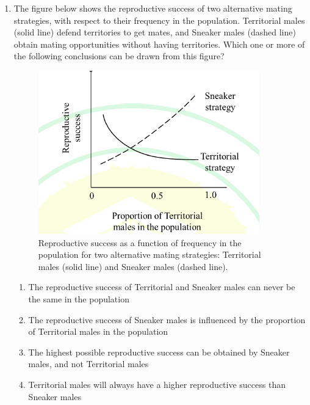 \documentclass[journal]{IEEEtran}
\begin{document}
\begin{enumerate}
    \item The figure below shows the reproductive success of two alternative mating strategies, with 
respect to their frequency in the population. Territorial males (solid line) defend territories to get mates, and Sneaker males (dashed line) obtain mating opportunities without having territories.
Which one or more of the following conclusions can be drawn from this figure?
\begin{figure}[!h]
        \centering
        \includegraphics[width=0.4\columnwidth]{figs/Q.58.png}
        \caption{Reproductive success as a function of frequency in the population for two alternative mating strategies: Territorial males (solid line) and Sneaker males (dashed line).}
        \label{fig:Q.58}
    \end{figure}
    \begin{enumerate}
        \item The reproductive success of Territorial and Sneaker males can never be the same in the population
        \item The reproductive success of Sneaker males is influenced by the proportion of Territorial males in the population
        \item The highest possible reproductive success can be obtained by Sneaker males, and not Territorial males
    
    \item Territorial males will always have a higher reproductive success than Sneaker males
    \end{enumerate}
    

\end{enumerate}
\end{document}
